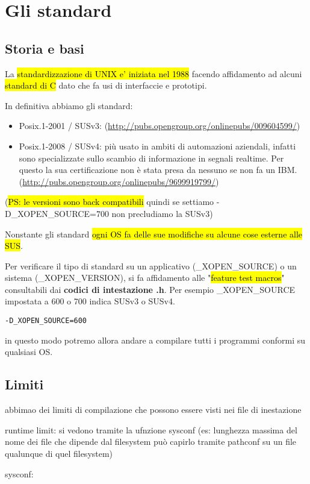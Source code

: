 \newpage
\section{Gli standard}

\subsection{Storia e basi}

La \hl{standardizzazione di UNIX e' iniziata nel 1988} facendo affidamento ad alcuni \hl{standard di C} dato che fa usi di interfaccie e prototipi.

In definitiva abbiamo gli standard:

\begin{itemize}
	\item Posix.1-2001 / SUSv3: (\url{http://pubs.opengroup.org/onlinepubs/009604599/})
	\item Posix.1-2008 / SUSv4:  più usato in ambiti di automazioni aziendali, infatti sono specializzate sullo scambio di informazione in segnali realtime. Per questo la sua certificazione non è stata presa da nessuno se non fa un IBM. (\url{http://pubs.opengroup.org/onlinepubs/9699919799/})
\end{itemize}

(\hl{PS: le versioni sono back compatibili} quindi se settiamo -D\_XOPEN\_SOURCE=700 non precludiamo la SUSv3)

Nonstante gli standard \hl{ogni OS fa delle sue modifiche su alcune cose esterne alle SUS}.

Per verificare il tipo di standard su un applicativo (\_XOPEN\_SOURCE) o un sistema (\_XOPEN\_VERSION), si fa affidamento alle "\hl{feature test macros}" consultabili dai \textbf{codici di intestazione .h}. Per esempio \_XOPEN\_SOURCE impostata a 600 o 700 indica SUSv3 o SUSv4.

\begin{lstlisting}
-D_XOPEN_SOURCE=600
\end{lstlisting}

in questo modo potremo allora andare a compilare tutti i programmi conformi su qualsiasi OS.


\subsection{Limiti}

abbimao dei limiti di compilazione che possono essere visti nei file di inestazione

runtime limit: si vedono tramite la ufnzione sysconf (es: lunghezza massima del nome dei file che dipende dal filesystem può capirlo tramite pathconf su un file qualunque di quel filesystem)

sysconf:
